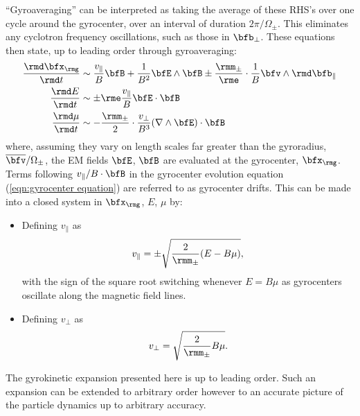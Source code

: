     ``Gyroaveraging'' can be interpreted as taking the average of these RHS's over one cycle around the gyrocenter, over an interval of duration $2\pi/\Omega_{\pm}$. This eliminates any cyclotron frequency oscillations, such as those in $\bfb_{\perp}$. These equations then state, up to leading order through gyroaveraging:
    \begin{align}
      \frac{\rmd\bfx_{\rmg}}{\rmd t}  &\sim  \frac{v_{\parallel}}{B}\bfB + \frac{1}{B^{2}}\bfE\wedge\bfB \pm \frac{\rmm_{\pm}}{\rme}\cdot\frac{1}{B}\bfv\wedge\rmd\bfb_{\parallel}  \label{eqn:gyroaveraged gyrocenter equation}  \\
               \frac{\rmd E}{\rmd t}  &\sim  \pm\rme\frac{v_{\parallel}}{B}\bfE\cdot\bfB  \\
              \frac{\rmd\mu}{\rmd t}  &\sim  - \frac{\rmm_{\pm}}{2}\cdot\frac{v_{\perp}}{B^{3}}(\nabla\wedge\bfE)\cdot\bfB  \label{eqn:gyroaveraged magnetic moment equation}
    \end{align}
    where, assuming they vary on length scales far greater than the gyroradius, $\overline{\bfv}/\Omega_{\pm}$, the EM fields $\bfE$, $\bfB$ are evaluated at the gyrocenter, $\bfx_{\rmg}$.  Terms following $v_{\parallel}/B\cdot\bfB$ in the gyrocenter evolution equation (\ref{eqn:gyrocenter equation}) are referred to as gyrocenter drifts. \cite{Woods_2006, Freidberg_2008, Chen_2015} This can be made into a closed system in $\bfx_{\rmg}$, $E$, $\mu$ by:
    \begin{itemize}
        \item  Defining $v_{\parallel}$ as
        \begin{equation}
            v_{\parallel}  =  \pm \sqrt{\frac{2}{\rmm_{\pm}}(E - B\mu)},
        \end{equation}
        with the sign of the square root switching whenever $E  =  B\mu$ as gyrocenters oscillate along the magnetic field lines. \cite{Freidberg_2008}
        \item  Defining $v_{\perp}$ as
        \begin{equation}
            v_{\perp}  =  \sqrt{\frac{2}{\rmm_{\pm}}B\mu}.
        \end{equation}
    \end{itemize}

    \line

    The gyrokinetic expansion presented here is up to leading order. Such an expansion can be extended to arbitrary order however to an accurate picture of the particle dynamics up to arbitrary accuracy.

